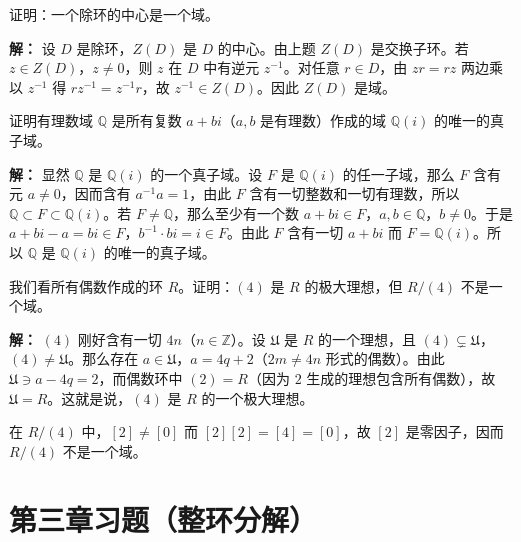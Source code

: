 \begin{example}[除环的中心是域]
证明：一个除环的中心是一个域。

\textbf{解：} 设 $D$ 是除环，$Z(D)$ 是 $D$ 的中心。由上题 $Z(D)$ 是交换子环。若 $z\in Z(D)$，$z\ne0$，则 $z$ 在 $D$ 中有逆元 $z^{-1}$。对任意 $r\in D$，由 $zr=rz$ 两边乘以 $z^{-1}$ 得 $rz^{-1}=z^{-1}r$，故 $z^{-1}\in Z(D)$。因此 $Z(D)$ 是域。
\end{example}

\begin{example}
证明有理数域 $\mathbb{Q}$ 是所有复数 $a+bi$（$a,b$ 是有理数）作成的域 $\mathbb{Q}(i)$ 的唯一的真子域。

\textbf{解：} 显然 $\mathbb{Q}$ 是 $\mathbb{Q}(i)$ 的一个真子域。设 $F$ 是 $\mathbb{Q}(i)$ 的任一子域，那么 $F$ 含有元 $a\ne0$，因而含有 $a^{-1}a=1$，由此 $F$ 含有一切整数和一切有理数，所以 $\mathbb{Q}\subset F\subset\mathbb{Q}(i)$。若 $F\ne\mathbb{Q}$，那么至少有一个数 $a+bi\in F$，$a,b\in\mathbb{Q}$，$b\ne0$。于是 $a+bi-a=bi\in F$，$b^{-1}\cdot bi=i\in F$。由此 $F$ 含有一切 $a+bi$ 而 $F=\mathbb{Q}(i)$。所以 $\mathbb{Q}$ 是 $\mathbb{Q}(i)$ 的唯一的真子域。
\end{example}

\begin{example}
我们看所有偶数作成的环 $R$。证明：$(4)$ 是 $R$ 的极大理想，但 $R/(4)$ 不是一个域。

\textbf{解：} $(4)$ 刚好含有一切 $4n$（$n\in\mathbb{Z}$）。设 $\mathfrak{U}$ 是 $R$ 的一个理想，且 $(4)\subsetneq\mathfrak{U}$，$(4)\ne\mathfrak{U}$。那么存在 $a\in\mathfrak{U}$，$a=4q+2$（$2m\ne4n$ 形式的偶数）。由此 $\mathfrak{U}\ni a-4q=2$，而偶数环中 $(2)=R$（因为 $2$ 生成的理想包含所有偶数），故 $\mathfrak{U}=R$。这就是说，$(4)$ 是 $R$ 的一个极大理想。

在 $R/(4)$ 中，$[2]\ne[0]$ 而 $[2][2]=[4]=[0]$，故 $[2]$ 是零因子，因而 $R/(4)$ 不是一个域。
\end{example}

\section{第三章习题（整环分解）}


